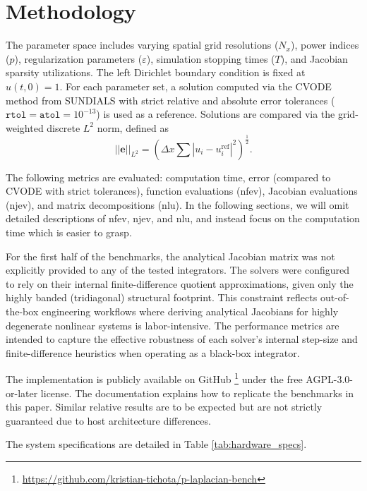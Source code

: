 \section{Methodology}
The parameter space includes varying spatial grid resolutions (\(N_x\)), power indices (\(p\)), regularization parameters (\(\varepsilon\)), simulation stopping times (\(T\)), and Jacobian sparsity utilizations. The left Dirichlet boundary condition is fixed at \(u(t,0) = 1\). For each parameter set, a solution computed via the CVODE method from SUNDIALS with strict relative and absolute error tolerances (\(\texttt{rtol} = \texttt{atol} = 10^{-13}\)) is used as a reference. Solutions are compared via the grid-weighted discrete \(L^2\) norm, defined as
\begin{equation}
  ||\mathbf{e}||_{L^2}=\left(\Delta x \sum |u_i - u_i^{\text{ref}}|^2\right)^{\frac{1}{2}}.
  \end{equation}

  The following metrics are evaluated: computation time, error (compared to CVODE with strict tolerances), function evaluations (nfev), Jacobian evaluations (njev), and matrix decompositions (nlu). In the following sections, we will omit detailed descriptions of nfev, njev, and nlu, and instead focus on the computation time which is easier to grasp.

  For the first half of the benchmarks, the analytical Jacobian matrix was not explicitly provided to any of the tested integrators. The solvers were configured to rely on their internal finite-difference quotient approximations, given only the highly banded (tridiagonal) structural footprint. This constraint reflects out-of-the-box engineering workflows where deriving analytical Jacobians for highly degenerate nonlinear systems is labor-intensive. The performance metrics are intended to capture the effective robustness of each solver's internal step-size and finite-difference heuristics when operating as a black-box integrator.   

The implementation is publicly available on GitHub \footnote{\url{https://github.com/kristian-tichota/p-laplacian-bench}} under the free AGPL-3.0-or-later license. The documentation explains how to replicate the benchmarks in this paper. Similar relative results are to be expected but are not strictly guaranteed due to host architecture differences.

The system specifications are detailed in Table \ref{tab:hardware_specs}.

